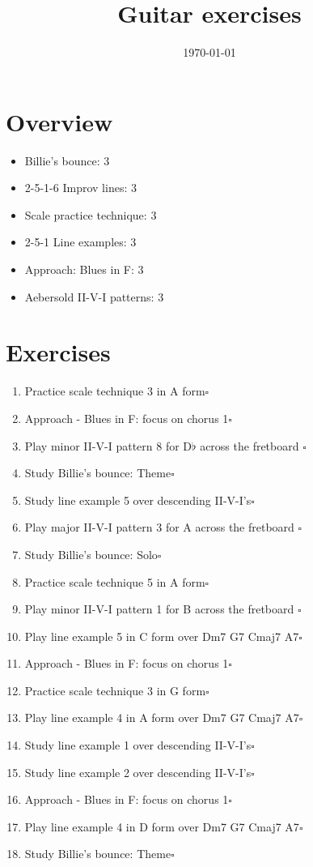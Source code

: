 \documentclass[letterpaper]{article}
\title{Guitar exercises}
\date{\vspace{-3em}\today}
\author{}
\begin{document}
\maketitle
\section*{Overview}
\begin{itemize}
\item Billie's bounce: 3
\item 2-5-1-6 Improv lines: 3
\item Scale practice technique: 3
\item 2-5-1 Line examples: 3
\item Approach: Blues in F: 3
\item Aebersold II-V-I patterns: 3
\end{itemize}
\section*{Exercises}\begin{enumerate}
	\item Practice scale technique 3 in A form\dotfill$\square$
	\item Approach - Blues in F: focus on chorus 1\dotfill$\square$
	\item Play minor II-V-I pattern 8 for D$\flat$ across the fretboard \label{minor8-1}\dotfill$\square$
	\item Study Billie's bounce: Theme\dotfill$\square$
	\item Study line example 5 over descending II-V-I's\dotfill$\square$
	\item Play major II-V-I pattern 3 for A across the fretboard \label{major3-1}\dotfill$\square$
	\item Study Billie's bounce: Solo\dotfill$\square$
	\item Practice scale technique 5 in A form\dotfill$\square$
	\item Play minor II-V-I pattern 1 for B across the fretboard \label{minor1-1}\dotfill$\square$
	\item Play line example 5 in C form over Dm7 G7 Cmaj7 A7\dotfill$\square$
	\item Approach - Blues in F: focus on chorus 1\dotfill$\square$
	\item Practice scale technique 3 in G form\dotfill$\square$
	\item Play line example 4 in A form over Dm7 G7 Cmaj7 A7\dotfill$\square$
	\item Study line example 1 over descending II-V-I's\dotfill$\square$
	\item Study line example 2 over descending II-V-I's\dotfill$\square$
	\item Approach - Blues in F: focus on chorus 1\dotfill$\square$
	\item Play line example 4 in D form over Dm7 G7 Cmaj7 A7\dotfill$\square$
	\item Study Billie's bounce: Theme\dotfill$\square$
\end{enumerate}
\end{document}
